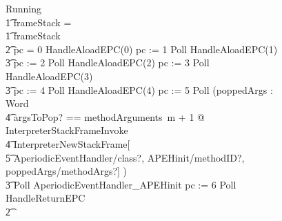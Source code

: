 \begin{figure}[t]
  \setlength{\zedindent}{0cm}
  \setlength{\zedtab}{0.3cm}
  \setlength{\zedleftsep}{0cm}
  \begin{circus}
    Running \circdef \\
    \t1 \circif frameStack = \emptyset \circthen \Skip \\
    \t1 {} \circelse frameStack \neq \emptyset \circthen {} \\
    \t2 {} \circif pc = 0 \circthen HandleAloadEPC(0) \circseq pc := 1 \circseq Poll \circseq HandleAloadEPC(1) \circseq \\
    \t3 pc := 2 \circseq Poll \circseq HandleAloadEPC(2) \circseq pc := 3 \circseq Poll \circseq HandleAloadEPC(3) \circseq \\
    \t3 pc := 4 \circseq Poll \circseq HandleAloadEPC(4) \circseq pc := 5 \circseq Poll \circseq (\circvar poppedArgs : \seq Word \circspot \\
    \t4 \lschexpract \exists argsToPop?  == methodArguments~m + 1 @ InterpreterStackFrameInvoke \rschexpract \circseq \\
    \t4 \lschexpract InterpreterNewStackFrame[\\
    \t5 AperiodicEventHandler/class?, APEHinit/methodID?, poppedArgs/methodArgs?] \rschexpract) \\
    \t3 Poll \circseq AperiodicEventHandler\_APEHinit \circseq pc := 6 \circseq Poll \circseq HandleReturnEPC \\
    \t2 {} \cdots {} \\

\end{circus}
\end{figure}
